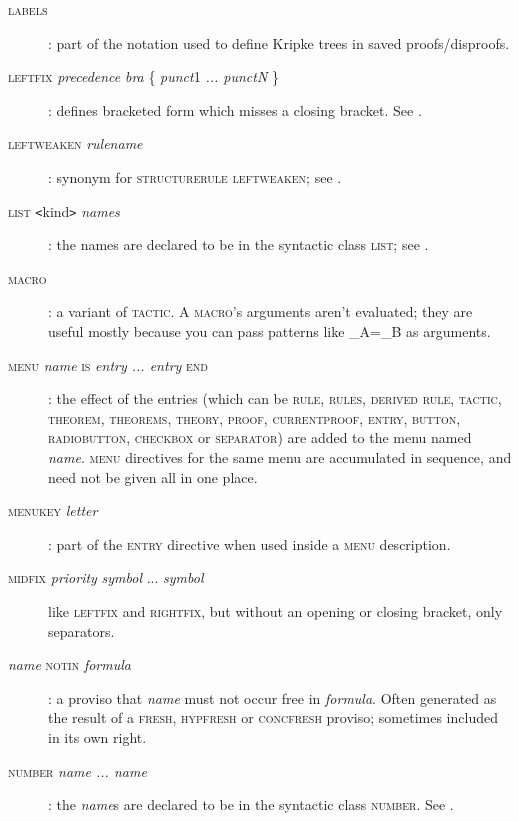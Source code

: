 \begin{description}
\item[\textsc{labels}]: part of the notation used to define Kripke trees in saved proofs/disproofs.

\item[\textsc{leftfix} \textit{precedence} \textit{bra} \{ \textit{punct}1 \textit{... punctN} \}]: defines bracketed form which misses a closing bracket. See .

\item[\textsc{leftweaken} \textit{rulename}]: synonym for \textsc{structurerule} \textsc{leftweaken}; see .

\item[\textsc{list \texttt{<}}kind\textsc{\texttt{>}} \textit{names}]: the names are declared to be in the syntactic class \textsc{list}; see .

\item[\textsc{macro}]: a variant of \textsc{tactic}. A \textsc{macro}'s arguments aren't evaluated; they are useful mostly because you can pass patterns like \_A=\_B as arguments.

\item[\textsc{menu} \textit{name} \textsc{is} \textit{entry ... entry} \textsc{end}]: the effect of the entries (which can be \textsc{rule, rules, derived rule, tactic, theorem, theorems, theory, proof, currentproof, entry, button, radiobutton, checkbox} or \textsc{separator)} are added to the menu named \textit{name}. \textsc{menu} directives for the same menu are accumulated in sequence, and need not be given all in one place.

\item[\textsc{menukey} \textit{letter}]: part of the \textsc{entry} directive when used inside a \textsc{menu} description.

\item[\textsc{midfix} \textit{priority} \textit{symbol} ... \textit{symbol}]\! like \textsc{leftfix} and \textsc{rightfix}, but without an opening or closing bracket, only separators.
 
\item[\textit{name} \textsc{notin} \textit{formula}]: a proviso that \textit{name} must not occur free in \textit{formula}. Often generated as the result of a \textsc{fresh, hypfresh} or \textsc{concfresh} proviso; sometimes included in its own right.

\item[\textsc{number} \textit{name ... name}]: the \textit{name}s are declared to be in the syntactic class \textsc{number}. See .


\end{description}
